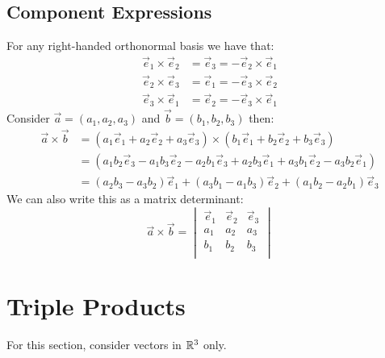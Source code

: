 \documentclass[../main.tex]{subfiles}
\begin{document}
\subsection{Component Expressions}
For any right-handed orthonormal basis we have that:
\begin{align*}
  \vec{e}_1 \times \vec{e}_2 &= \vec{e}_3 = -\vec{e}_2 \times \vec{e}_1 \\
  \vec{e}_2 \times \vec{e}_3 &= \vec{e}_1 = -\vec{e}_3 \times \vec{e}_2 \\
  \vec{e}_3 \times \vec{e}_1 &= \vec{e}_2 = -\vec{e}_3 \times \vec{e}_1
\end{align*}
Consider $\vec{a} = (a_1, a_2, a_3)$ and $\vec{b} = (b_1, b_2, b_3)$ then:
\begin{align*}
  \vec{a} \times \vec{b} &= (a_1 \vec{e}_1 + a_2 \vec{e}_2 + a_3 \vec{e}_3) \times (b_1 \vec{e}_1 + b_2 \vec{e}_2 + b_3 \vec{e}_3) \\
                         &= (a_1 b_2 \vec{e}_3 - a_1 b_3 \vec{e}_2 - a_2 b_1 \vec{e}_3 + a_2 b_3 \vec{e}_1 + a_3 b_1 \vec{e}_2 - a_3 b_2 \vec{e}_1) \\
                         &= (a_2 b_3 - a_3 b_2) \vec{e}_1 + (a_3 b_1 - a_1 b_3) \vec{e}_2 + (a_1 b_2 - a_2 b_1) \vec{e}_3
\end{align*}
We can also write this as a matrix determinant:
\[
  \vec{a} \times \vec{b} =\begin{vmatrix}
  \vec{e}_1 & \vec{e}_2 & \vec{e}_3 \\
  a_1 & a_2 & a_3 \\
  b_1 & b_2 & b_3 \\
  \end{vmatrix}
\]
\section{Triple Products}
\begin{remark}[Note]
For this section, consider vectors in $\mathbb{R}^{3}$ only.
\end{remark}
\end{document}
